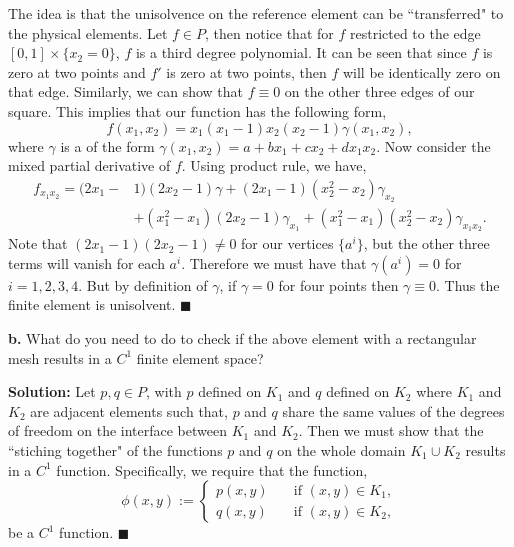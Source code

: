 \documentclass[11pt]{article}
\begin{document}
The idea is that the unisolvence on the reference element can be ``transferred" to the physical elements.
Let $f \in P$, then notice that for $f$ restricted to the edge $[0,1]\times\{x_2=0\}$, $f$ is a third degree polynomial.
It can be seen that since $f$ is zero at two points and $f'$ is zero at two points, then $f$ will be identically zero on that edge.
Similarly, we can show that $f \equiv 0$ on the other three edges of our square.
This implies that our function has the following form,
\begin{equation*}
    f(x_1, x_2) = x_1(x_1 - 1) x_2(x_2 - 1) \gamma(x_1, x_2),
\end{equation*}
where $\gamma$ is a of the form $\gamma(x_1, x_2) = a + bx_1 + cx_2 + dx_1 x_2$.
Now consider the mixed partial derivative of $f$.
Using product rule, we have,
\begin{align*}
    f_{x_1 x_2} = (2x_1 - &1)(2x_2 - 1) \gamma + (2x_1 - 1) (x_2^2 - x_2) \gamma_{x_2} \\
    & + (x_1^2 - x_1)(2x_2 - 1) \gamma_{x_1} + (x_1^2 - x_1)(x_2^2 - x_2) \gamma_{x_1 x_2}.
\end{align*}
Note that $(2x_1 - 1)(2x_2 - 1) \neq 0$ for our vertices $\{a^i\}$, but the other three terms will vanish for each $a^i$.
Therefore we must have that $\gamma(a^i) = 0$ for $i = 1, 2, 3, 4$.
But by definition of $\gamma$, if $\gamma = 0$ for four points then $\gamma \equiv 0$. 
Thus the finite element is unisolvent.
$\blacksquare$


\vskip 2cm



\textbf{b.} What do you need to do to check if the above element with a rectangular mesh results in a $C^1$ finite element space?


\vskip 1cm


\textbf{Solution:} Let $p, q \in P$, with $p$ defined on $K_1$ and $q$ defined on $K_2$ where $K_1$ and $K_2$ are adjacent elements such that, $p$ and $q$ share the same values of the degrees of freedom on the interface between $K_1$ and $K_2$. 
Then we must show that the ``stiching together" of the functions $p$ and $q$ on the whole domain $K_1 \cup K_2$ results in a $C^1$ function.
Specifically, we require that the function,
\begin{equation}
	\phi(x,y) := \begin{cases}
		p(x,y) \quad &\text{if } (x,y) \in K_1, \\
		q(x,y) \quad &\text{if } (x,y) \in K_2,
	\end{cases}
\end{equation}
be a $C^1$ function.
$\blacksquare$
\end{document}
